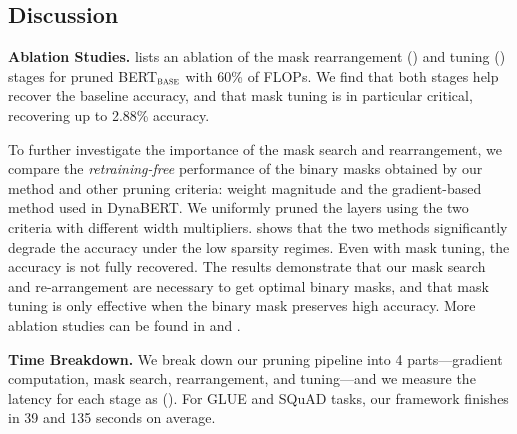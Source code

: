 \vspace{-1mm}
\subsection{Discussion} 
\label{subsection:analysis}
\vspace{-1mm}

\textbf{Ablation Studies.}
 lists an ablation of the mask rearrangement () and tuning () stages for pruned BERT$_\textsc{base}$ with 60\% of FLOPs.
We find that both stages help recover the baseline accuracy, and that mask tuning is in particular critical, recovering up to 2.88\% accuracy.

To further investigate the importance of the mask search and rearrangement, we compare the \textit{retraining-free} performance of the binary masks obtained by our method and other pruning criteria: weight magnitude and the gradient-based method used in DynaBERT.
We uniformly pruned the layers using the two criteria with different width multipliers.
 shows that the two methods significantly degrade the accuracy under the low sparsity regimes.
Even with mask tuning, the accuracy is not fully recovered.
The results demonstrate that our mask search and re-arrangement are necessary to get optimal binary masks, and that mask tuning is only effective when the binary mask preserves high accuracy.
More ablation studies can be found in  and .

\textbf{Time Breakdown.}
We break down our pruning pipeline into 4 parts---gradient computation, mask search, rearrangement, and tuning---and we measure the latency for each stage as  ().
For GLUE and SQuAD tasks, our framework finishes in 39 and 135 seconds on average.
